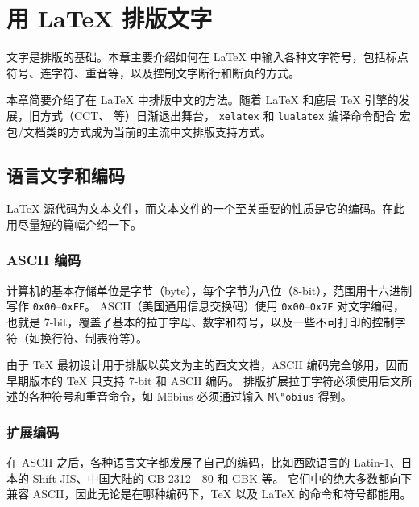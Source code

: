 \chapter{用 \LaTeX{} 排版文字}\label{chap:text}

\begin{intro}
文字是排版的基础。本章主要介绍如何在 \LaTeX{} 中输入各种文字符号，包括标点符号、连字符、重音等，以及控制文字断行和断页的方式。

本章简要介绍了在 \LaTeX{} 中排版中文的方法。随着 \LaTeX{} 和底层 \TeX{} 引擎的发展，旧方式（CCT、 等）日渐退出舞台，
\texttt{xelatex} 和 \texttt{lualatex} 编译命令配合  宏包/文档类的方式成为当前的主流中文排版支持方式。
\end{intro}

\section{语言文字和编码}\label{sec:encoding}

\LaTeX{} 源代码为文本文件，而文本文件的一个至关重要的性质是它的编码。在此用尽量短的篇幅介绍一下。

\subsection{ASCII 编码}\label{subsec:ascii}

计算机的基本存储单位是字节（byte），每个字节为八位（8-bit），范围用十六进制写作 \texttt{0x00}--\texttt{0xFF}。
ASCII（美国通用信息交换码）使用 \texttt{0x00}--\texttt{0x7F} 对文字编码，也就是 7-bit，覆盖了基本的拉丁字母、数字和符号，以及一些不可打印的控制字符（如换行符、制表符等）。

由于 \TeX{} 最初设计用于排版以英文为主的西文文档，ASCII 编码完全够用，因而早期版本的 \TeX{} 只支持 7-bit 和 ASCII 编码。
排版扩展拉丁字符必须使用后文所述的各种符号和重音命令，如 M\"obius 必须通过输入 \verb|M\"obius| 得到。

\subsection{扩展编码}\label{subsec:ext-encoding}

在 ASCII 之后，各种语言文字都发展了自己的编码，比如西欧语言的 Latin-1、日本的 Shift-JIS、中国大陆的 GB 2312---80 和 GBK 等。
它们中的绝大多数都向下兼容 ASCII，因此无论是在哪种编码下，\TeX{} 以及 \LaTeX{} 的命令和符号都能用。

